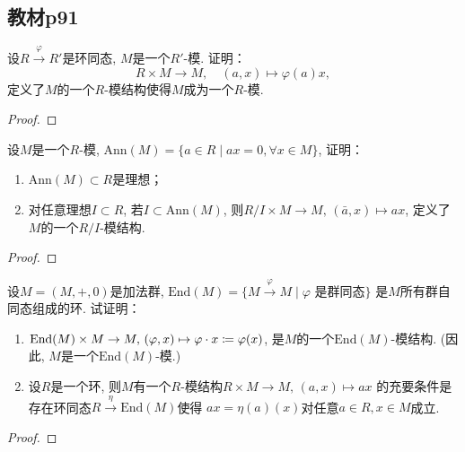 \subsection{教材p91}

\begin{problem}
    设$R \xrightarrow{\varphi} R'$是环同态, $M$是一个$R'$-模.
证明：
\[
    R \times M \to M,\quad (a, x) \mapsto \varphi(a)x,
\]
定义了$M$的一个$R$-模结构使得$M$成为一个$R$-模.
\end{problem}

\begin{proof}
    
\end{proof}

\begin{problem}
    设$M$是一个$R$-模, $\mathrm{Ann}(M) = \{a \in R \mid ax = 0, \forall x \in M\}$,
证明：
\begin{enumerate}[(1)]
    \item $\mathrm{Ann}(M) \subset R$是理想；
    \item 对任意理想$I \subset R$, 若$I \subset \mathrm{Ann}(M)$,
则$R/I \times M \to M,\, (\bar{a},x) \mapsto ax$,
定义了$M$的一个$R/I$-模结构.
\end{enumerate}
\end{problem}

\begin{proof}
    
\end{proof}

\begin{problem}
    设$M = (M, +, 0)$是加法群, $\mathrm{End}(M) = \{M \xrightarrow{\varphi} M \mid \varphi \text{ 是群同态}\}$
    是$M$所有群自同态组成的环. 试证明：
\begin{enumerate}[(1)]
    \item $\mathrm{End}(M) \times M \to M,\, (\varphi, x) \mapsto \varphi \cdot x \mathrel{\coloneqq} \varphi(x)$,
是$M$的一个$\mathrm{End}(M)$-模结构. (因此, $M$是一个$\mathrm{End}(M)$-模.)
    \item 设$R$是一个环, 则$M$有一个$R$-模结构$R \times M \to M,\, (a, x) \mapsto ax$
的充要条件是存在环同态$R \xrightarrow{\eta} \mathrm{End}(M)$使得
$ax = \eta(a)(x)$对任意$a \in R, x \in M$成立.
\end{enumerate}
\end{problem}

\begin{proof}

\end{proof}

